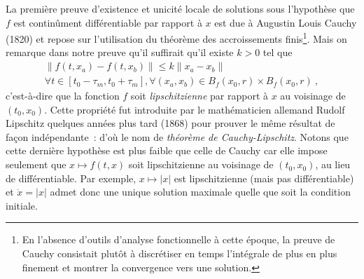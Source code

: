\hypertarget{rem_f_lips}{}
\begin{remarque}\label{rem_f_lips}
La première preuve d'existence et unicité locale de solutions sous
l'hypothèse que \(f\) est continûment différentiable par rapport à \(x\)
est due à Augustin Louis Cauchy (1820) et repose sur l'utilisation du
théorème des accroissements finis\footnote{En l'absence d'outils d'analyse
  fonctionnelle à cette époque, la preuve de Cauchy consistait plutôt à
  discrétiser en temps l'intégrale de plus en plus finement et montrer
  la convergence vers une solution.}. Mais on remarque dans notre preuve
qu'il suffirait qu'il existe \(k>0\) tel que \begin{multline*}
\|f(t,x_a)-f(t,x_b)\|\leq k \|x_a-x_b\| \\
 \forall t\in \left[t_0-\tau_m,t_0+\tau_m \right], \forall (x_a,x_b)\in B_f(x_0,r)\times B_f(x_0,r) \ ,
\end{multline*} c'est-à-dire que la fonction \(f\) soit
\emph{lipschitzienne} par rapport à \(x\) au voisinage de \((t_0,x_0)\).
Cette propriété fut introduite par le mathématicien allemand Rudolf
Lipschitz quelques années plus tard (1868) pour prouver le même résultat
de façon indépendante~: d'où le nom de \emph{théorème de
Cauchy-Lipschitz}. Notons que cette dernière hypothèse est plus faible
que celle de Cauchy car elle impose seulement que \(x\mapsto f(t,x)\)
soit lipschitzienne au voisinage de \((t_0,x_0)\), au lieu de
différentiable. Par exemple, \(x\mapsto |x|\) est lipschitzienne (mais
pas différentiable) et \(\dot{x}=|x|\) admet donc une unique solution
maximale quelle que soit la condition initiale.
\end{remarque}

